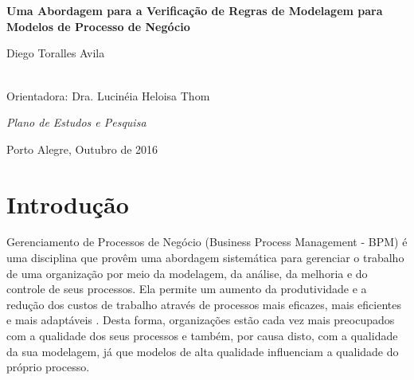 \documentclass[12pt]{article}
\begin{document}
	
\begin{titlepage}
	\thispagestyle{empty}
	
	\vfill 
	
	
	\begin{center}
		
		\\
		
		
		 \\
		
		\vspace*{2.5cm}
		
		
		\Large{{\bf Uma Abordagem para a Verificação de Regras de Modelagem para Modelos de Processo de Negócio }}
		
		\vspace*{2cm}
		
		
		\Large{Diego Toralles Avila\\ }\\ 
		
		
		\vspace*{1cm}
		
		\normalsize{Orientadora: Dra. Lucinéia Heloisa Thom}
		
		\vspace*{1.5cm}
		\begin{flushright} 
			\parbox[l]{9.3cm}{
				
				\normalsize{\emph{Plano de Estudos e Pesquisa}}}
		\end{flushright}
		\vspace*{2cm}
		
		\large{Porto Alegre, Outubro de 2016}
	\end{center}
\end{titlepage}

\section{Introdução}

Gerenciamento de Processos de Negócio (Business Process Management - BPM) é uma disciplina que provêm uma abordagem sistemática para gerenciar o trabalho de uma organização por meio da modelagem, da análise, da melhoria e do controle de seus processos. Ela permite um aumento da produtividade e a redução dos custos de trabalho através de processos mais eficazes, mais eficientes e mais adaptáveis \cite{aalst:2013}. Desta forma, organizações estão cada vez mais preocupados com a qualidade dos seus  processos e também, por causa disto, com a qualidade da sua modelagem,  já que modelos de alta qualidade influenciam a qualidade do próprio processo.
\end{document}
